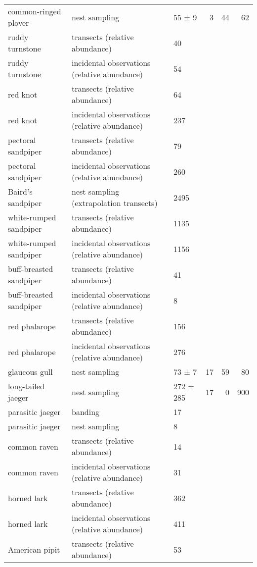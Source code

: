 \begin{table}[ht]
\begin{tabularx}{\textwidth}{lllrrr}
  common-ringed plover & nest sampling & 55 ± 9 &   3 &  44 &  62 \\ 
  ruddy turnstone & transects (relative abundance) & 40 &  &  &  \\ 
  ruddy turnstone & incidental observations (relative abundance) & 54 &  &  &  \\ 
  red knot & transects (relative abundance) & 64 &  &  &  \\ 
  red knot & incidental observations (relative abundance) & 237 &  &  &  \\ 
  pectoral sandpiper & transects (relative abundance) & 79 &  &  &  \\ 
  pectoral sandpiper & incidental observations (relative abundance) & 260 &  &  &  \\ 
  Baird's sandpiper & nest sampling (extrapolation transects) & 2495 &  &  &  \\ 
  white-rumped sandpiper & transects (relative abundance) & 1135 &  &  &  \\ 
  white-rumped sandpiper & incidental observations (relative abundance) & 1156 &  &  &  \\ 
  buff-breasted sandpiper & transects (relative abundance) & 41 &  &  &  \\ 
  buff-breasted sandpiper & incidental observations (relative abundance) & 8 &  &  &  \\ 
  red phalarope & transects (relative abundance) & 156 &  &  &  \\ 
  red phalarope & incidental observations (relative abundance) & 276 &  &  &  \\ 
  glaucous gull & nest sampling & 73 ± 7 &  17 &  59 &  80 \\ 
  long-tailed jaeger & nest sampling & 272 ± 285 &  17 &   0 & 900 \\ 
  parasitic jaeger & banding & 17 &  &  &  \\ 
  parasitic jaeger & nest sampling & 8 &  &  &  \\ 
  common raven & transects (relative abundance) & 14 &  &  &  \\ 
  common raven & incidental observations (relative abundance) & 31 &  &  &  \\ 
  horned lark & transects (relative abundance) & 362 &  &  &  \\ 
  horned lark & incidental observations (relative abundance) & 411 &  &  &  \\ 
  American pipit & transects (relative abundance) & 53 &  &  &  \\ 

\end{tabularx}
\end{table}
